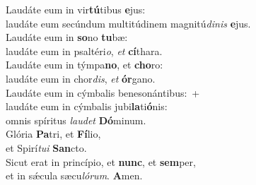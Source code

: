 \evenverse Laudáte eum in vir\textbf{tú}tibus \textbf{e}jus:~\*\\
\evenverse laudáte eum secúndum multitúdinem magnitú\textit{di}\textit{nis} \textbf{e}jus.\\
\oddverse Laudáte eum in \textbf{so}no \textbf{tu}bæ:~\*\\
\oddverse laudáte eum in psaltéri\textit{o}, \textit{et} \textbf{cí}thara.\\
\evenverse Laudáte eum in týmpa\textbf{no}, et \textbf{cho}ro:~\*\\
\evenverse laudáte eum in chor\textit{dis}, \textit{et} \textbf{ór}gano.\\
\oddverse Laudáte eum in cýmbalis benesonántibus:~+\\
\oddverse  laudáte eum in cýmbalis jubi\textbf{la}ti\textbf{ó}nis:~\*\\
\oddverse omnis spíritus \textit{lau}\textit{det} \textbf{Dó}minum.\\
\evenverse Glória \textbf{Pa}tri, et \textbf{Fí}lio,~\*\\
\evenverse et Spirí\textit{tu}\textit{i} \textbf{San}cto.\\
\oddverse Sicut erat in princípio, et \textbf{nunc}, et \textbf{sem}per,~\*\\
\oddverse et in sǽcula sæcu\textit{ló}\textit{rum}. \textbf{A}men.\\
